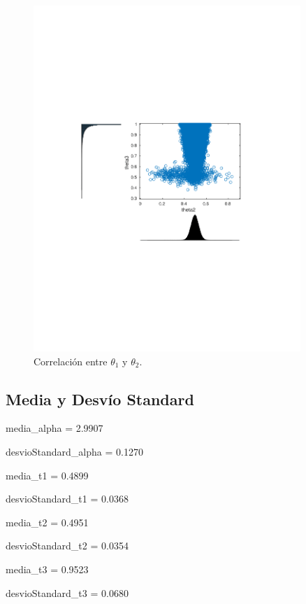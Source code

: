 \begin{figure}[H]
\centering
\begin{minipage}{0.5\textwidth}
	\includegraphics[width=0.9\textwidth]{imgs/theta2_3.png}
	\caption{\footnotesize Correlación entre $\theta_1$ y $\theta_2$.}
\end{minipage}	
\end{figure}


\subsection{Media y Desvío Standard}

media\_alpha = 2.9907

desvioStandard\_alpha = 0.1270

media\_t1 = 0.4899

desvioStandard\_t1 = 0.0368

media\_t2 = 0.4951

desvioStandard\_t2 = 0.0354

media\_t3 = 0.9523

desvioStandard\_t3 = 0.0680